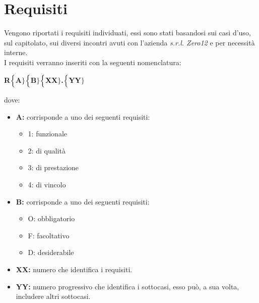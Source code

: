 \chapter{Requisiti}
Vengono riportati i requisiti individuati, essi sono stati basandosi sui casi d'uso, sul capitolato, sui diversi incontri avuti con l'azienda \textit{s.r.l. Zero12} e per necessità interne. \\
I requisiti verranno inseriti con la seguenti nomenclatura:
\begin{center}
	\textbf{R$\Bigl\{$A$\Bigr\}$$\Bigl\{$B$\Bigr\}$$\Bigl\{$XX$\Bigr\}$.$\Bigl\{$YY$\Bigr\}$}
\end{center}
dove:
\begin{itemize}
	\item \textbf{A:} corrisponde a uno dei seguenti requisiti:
	\begin{itemize}
		\item 1: funzionale
		\item 2: di qualità
		\item 3: di prestazione
		\item 4: di vincolo
	\end{itemize}
	\item \textbf{B:} corrisponde a uno dei seguenti requisiti:
	\begin{itemize}
		\item O: obbligatorio
		\item F: facoltativo
		\item D: desiderabile
	\end{itemize}
	\item \textbf{{XX}:} numero che identifica i requisiti.
	\item \textbf{{YY}:} numero progressivo che identifica i sottocasi, esso può, a sua volta, includere altri sottocasi.
\end{itemize}

